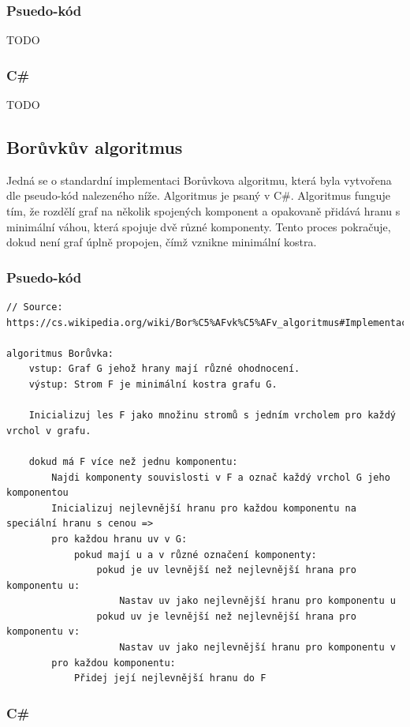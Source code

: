 \documentclass[11pt]{article}
\begin{document}
\subsubsection{Psuedo-kód}
TODO

\subsubsection{C\#}
TODO

\pagebreak
\subsection{Borůvkův algoritmus}
Jedná se o standardní implementaci Borůvkova algoritmu, která byla vytvořena dle pseudo-kód nalezeného níže. Algoritmus je psaný v C\#.
Algoritmus funguje tím, že rozdělí graf na několik 
spojených komponent a opakovaně přidává hranu s minimální váhou, která spojuje dvě různé komponenty. 
Tento proces pokračuje, dokud není graf úplně propojen, čímž vznikne minimální kostra.

\subsubsection{Psuedo-kód}
\begin{lstlisting}
// Source: https://cs.wikipedia.org/wiki/Bor%C5%AFvk%C5%AFv_algoritmus#Implementace_v_pseudok%C3%B3du

algoritmus Borůvka:
    vstup: Graf G jehož hrany mají různé ohodnocení.
    výstup: Strom F je minimální kostra grafu G.

    Inicializuj les F jako množinu stromů s jedním vrcholem pro každý vrchol v grafu.

    dokud má F více než jednu komponentu:
        Najdi komponenty souvislosti v F a označ každý vrchol G jeho komponentou
        Inicializuj nejlevnější hranu pro každou komponentu na speciální hranu s cenou =>
        pro každou hranu uv v G:
            pokud mají u a v různé označení komponenty:
                pokud je uv levnější než nejlevnější hrana pro komponentu u:
                    Nastav uv jako nejlevnější hranu pro komponentu u
                pokud uv je levnější než nejlevnější hrana pro komponentu v:
                    Nastav uv jako nejlevnější hranu pro komponentu v
        pro každou komponentu:
            Přidej její nejlevnější hranu do F
\end{lstlisting}

\subsubsection{C\#}
\end{document}
